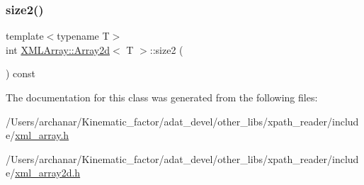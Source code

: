 \subsubsection{\texorpdfstring{size2()}{size2()}\hspace{0.1cm}{\footnotesize\ttfamily [2/2]}}
{\footnotesize\ttfamily template$<$typename T$>$ \\
int \mbox{\hyperlink{classXMLArray_1_1Array2d}{X\+M\+L\+Array\+::\+Array2d}}$<$ T $>$\+::size2 (\begin{DoxyParamCaption}{ }\end{DoxyParamCaption}) const\hspace{0.3cm}{\ttfamily [inline]}}



The documentation for this class was generated from the following files\+:\begin{DoxyCompactItemize}
\item 
/\+Users/archanar/\+Kinematic\+\_\+factor/adat\+\_\+devel/other\+\_\+libs/xpath\+\_\+reader/include/\mbox{\hyperlink{other__libs_2xpath__reader_2include_2xml__array_8h}{xml\+\_\+array.\+h}}\item 
/\+Users/archanar/\+Kinematic\+\_\+factor/adat\+\_\+devel/other\+\_\+libs/xpath\+\_\+reader/include/\mbox{\hyperlink{other__libs_2xpath__reader_2include_2xml__array2d_8h}{xml\+\_\+array2d.\+h}}\end{DoxyCompactItemize}
